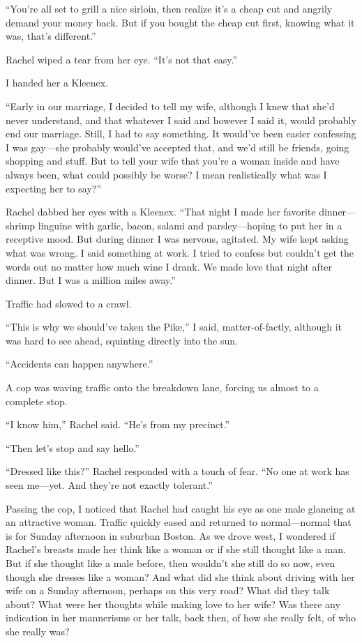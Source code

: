 ``You're all set to grill a nice sirloin, then realize it's a cheap cut
and angrily demand your money back. But if you bought the cheap cut
first, knowing what it was, that's different.''

Rachel wiped a tear from her eye. ``It's not that easy.''

I handed her a Kleenex.

``Early in our marriage, I decided to tell my wife, although I knew that
she'd never understand, and that whatever I said and however I said it,
would probably end our marriage. Still, I had to say something. It
would've been easier confessing I was gay---she probably would've
accepted that, and we'd still be friends, going shopping and stuff. But
to tell your wife that you're a woman inside and have always been, what
could possibly be worse? I mean realistically what was I expecting her
to say?''

Rachel dabbed her eyes with a Kleenex. ``That night I made her favorite
dinner---shrimp linguine with garlic, bacon, salami and pars\-ley---hoping
to put her in a receptive mood. But during dinner I was nervous,
agitated. My wife kept asking what was wrong. I said something at work.
I tried to confess but couldn't get the words out no matter how much
wine I drank. We made love that night after dinner. But I was a million
miles away.''

Traffic had slowed to a crawl.

``This is why we should've taken the Pike,'' I said, matter-of-factly,
although it was hard to see ahead, squinting directly into the sun.

``Accidents can happen anywhere.''

A cop was waving traffic onto the breakdown lane, forcing us almost to a
complete stop.

``I know him,'' Rachel said. ``He's from my precinct.''

``Then let's stop and say hello.''

``Dressed like this?'' Rachel responded with a touch of fear. ``No one
at work has seen me---yet. And they're not exactly tolerant.''

Passing the cop, I noticed that Rachel had caught his eye as one male
glancing at an attractive woman. Traffic quickly eased and returned to
normal---normal that is for Sunday afternoon in suburban Boston. As we
drove west, I wondered if Rachel's breasts made her think like a woman
or if she still thought like a man. But if she thought like a male
before, then wouldn't she still do so now, even though she dresses like
a woman? And what did she think about driving with her wife on a Sunday
afternoon, perhaps on this very road? What did they talk about? What
were her thoughts while making love to her wife? Was there any
indication in her mannerisms or her talk, back then, of how she really
felt, of who she really was?


